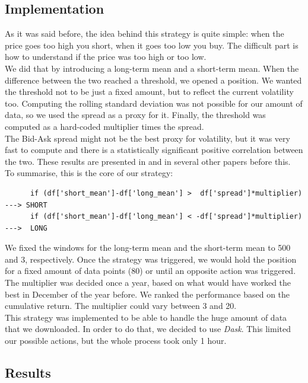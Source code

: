 \documentclass[a4paper]{article}
\begin{document}
\subsection{Implementation}

As it was said before, the idea behind this strategy is quite simple: when the price goes too high you short, when it goes too low you buy. The difficult part is how to understand if the price was too high or too low.\\
We did that by introducing a long-term mean and a short-term mean. When the difference between the two reached a threshold, we opened a position. We wanted the threshold not to be just a fixed amount, but to reflect the current volatility too. Computing the rolling standard deviation was not possible for our amount of data, so we used the spread as a proxy for it. Finally, the threshold was computed as a hard-coded multiplier times the spread.\\
The Bid-Ask spread might not be the best proxy for volatility, but it was very fast to compute and there is a statistically significant positive correlation between the two. These results are presented in \cite{hussain_intraday_2011} and in several other papers before this.\\
To summarise, this is the core of our strategy:
\begin{verbatim}
      if (df['short_mean']-df['long_mean'] >  df['spread']*multiplier) ---> SHORT
      if (df['short_mean']-df['long_mean'] < -df['spread']*multiplier) --->  LONG
\end{verbatim}
We fixed the windows for the long-term mean and the short-term mean to 500 and 3, respectively. Once the strategy was triggered, we would hold the position for a fixed amount of data points (80) or until an opposite action was triggered.\\
The multiplier was decided once a year, based on what would have worked the best in December of the year before. We ranked the performance based on the cumulative return. The multiplier could vary between 3 and 20.\\
This strategy was implemented to be able to handle the huge amount of data that we downloaded. In order to do that, we decided to use \emph{Dask}. This limited our possible actions, but the whole process took only 1 hour.

\subsection{Results}
\end{document}
